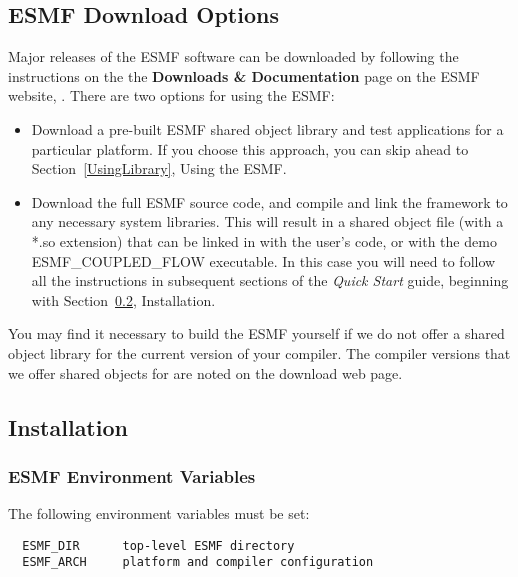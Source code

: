 
\subsection{ESMF Download Options}

Major releases of the ESMF software can be downloaded by following
the instructions on the 
the {\bf Downloads \& Documentation} page on the ESMF 
website, .  There are two options for using the ESMF:

\begin{itemize}
\item Download a pre-built ESMF shared object library and
test applications for a particular platform.  If you choose
this approach, you can skip ahead to Section~\ref{UsingLibrary},
Using the ESMF.  
\item Download the full ESMF source code, and compile and link
the framework to any necessary system libraries.  This will
result in a shared object file (with a *.so extension)
that can be linked in with the user's code, or with the demo
{ESMF\_COUPLED\_FLOW} executable.  In this case you will need
to follow all the instructions in subsequent sections of the 
{\it Quick Start} guide, beginning with Section~\ref{InstallProcedures},
Installation.
\end{itemize}

You may find it necessary to build the ESMF yourself
if we do not offer a shared object library for the current
version of your compiler.  The compiler versions that we offer
shared objects for are noted on the download web page.

\subsection{Installation}
\label{InstallProcedures}



\subsubsection{ESMF Environment Variables}

The following environment variables must be set:
\begin{verbatim}
  ESMF_DIR      top-level ESMF directory
  ESMF_ARCH     platform and compiler configuration
\end{verbatim}

